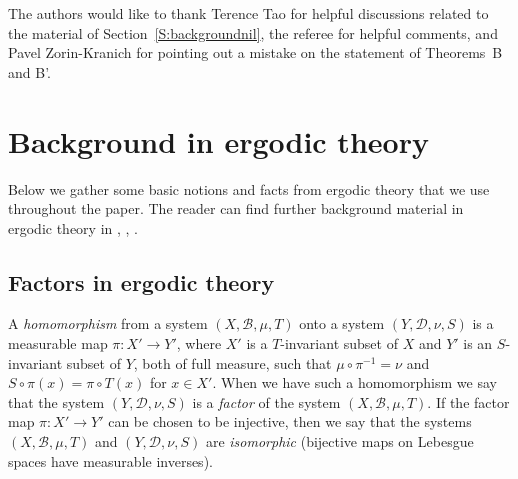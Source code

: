 \documentclass[11pt]{amsart}
\newcommand{\cB}{\mathcal{B}}
\newcommand{\cD}{\mathcal{D}}
\theoremstyle{plain}
\theoremstyle{definition}
\theoremstyle{remark}
\begin{document}
\bigskip


 The authors would like to thank
Terence Tao for helpful discussions related to the material of
Section~\ref{S:backgroundnil},  the referee  for helpful comments,
and Pavel Zorin-Kranich for pointing out a mistake on the statement
of Theorems~B and B'.



\section{Background in ergodic theory}\label{S:backgroundergodic}
Below we gather some basic notions and facts from ergodic theory that
we use throughout the paper. The reader can find further background
material in ergodic theory in  \cite{Fu2}, \cite{Pe},
\cite{Wa}.
\subsection{Factors in ergodic theory}
A {\it homomorphism} from a system $(X,\mathcal{B},\mu, T)$ onto a
system $(Y, \cD, \nu, S)$ is a measurable map $\pi\colon X'\to Y'$,
where $X'$ is a $T$-invariant subset of $X$ and $Y'$ is an
$S$-invariant subset of $Y$, both of full measure, such that
$\mu\circ\pi^{-1} = \nu$ and $S\circ\pi(x) = \pi\circ T(x)$ for $x\in
X'$. When we have such a homomorphism we say that the system $(Y, \cD,
\nu, S)$ is a {\it factor} of the system $(X,\mathcal{B},\mu, T)$.  If
the factor map $\pi\colon X'\to Y'$ can be chosen to be injective,
then we say that the systems $(X,\cB, \mu, T)$ and $(Y, \cD, \nu, S)$
are {\it isomorphic} (bijective maps on Lebesgue spaces have
measurable inverses).
\end{document}
